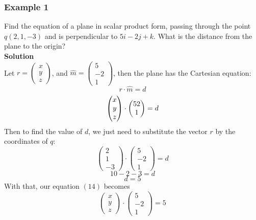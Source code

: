 \documentclass[hidelinks, a4paper, 12pt]{article}
\newcommand{\bd}{\textbf}
\newcommand{\mhat}{\hat{m}}
\newcommand{\n}{\\[\baselineskip]}
\begin{document}
            \subsubsection{Example 1}
                Find the equation of a plane in scalar product form, passing through the point $q(2, 1, -3)$ and is perpendicular to $5i-2j+k$. What is the distance from the plane
                to the origin?\n
                \bd{Solution}\n
                Let $r = \begin{pmatrix} x \\ y \\ z \end{pmatrix}$, and $\mhat = \begin{pmatrix} 5 \\ -2 \\ 1 \end{pmatrix}$, then the plane has the Cartesian equation:
                \[r\cdot\mhat = d\]
                \begin{equation}
                    \begin{pmatrix} x\\y\\z \end{pmatrix} \cdot \begin{pmatrix} 5\-2\\1 \end{pmatrix} = d
                \end{equation}
                Then to find the value of $d$, we just need to substitute the vector $r$ by the coordinates of $q$:
                \[\begin{pmatrix}2\\1\\-3 \end{pmatrix} \cdot \begin{pmatrix} 5\\-2\\1 \end{pmatrix} = d\]
                \[10-2-3 = d\]
                \begin{equation}d = 5\end{equation}
                With that, our equation $(14)$ becomes
                \[\begin{pmatrix} x\\y\\z \end{pmatrix} \cdot \begin{pmatrix} 5\\-2\\1 \end{pmatrix} = 5\]
\end{document}

